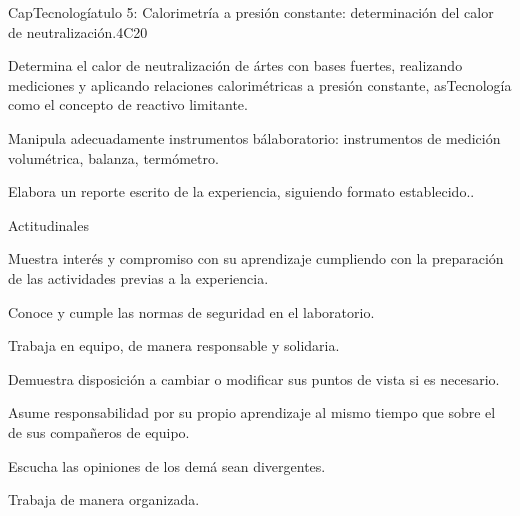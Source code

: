 \begin{syllabus}
\begin{unit}{CapTecnologíatulo 5:  Calorimetría a presión constante: determinación del calor de neutralización.}{}{}{4}{C20}
\begin{topics}
      \item Determina el calor de neutralización de ártes con bases fuertes, realizando mediciones y aplicando relaciones calorimétricas a presión constante, asTecnología como el concepto de reactivo limitante.
      \item Manipula adecuadamente instrumentos bálaboratorio: instrumentos de medición volumétrica, balanza, termómetro.
      \item Elabora un reporte escrito de la experiencia, siguiendo formato establecido..
   \end{topics}
   
   Actitudinales

\begin{topics}
      \item Muestra interés y compromiso con su aprendizaje cumpliendo con la preparación de las actividades previas a la experiencia.
	  \item Conoce y cumple las normas de seguridad en el laboratorio.
	  \item Trabaja en equipo, de manera responsable y solidaria.
	  \item Demuestra disposición a cambiar o modificar sus puntos de vista si es necesario.
	  \item Asume responsabilidad por su propio aprendizaje al mismo tiempo que sobre el de sus compañeros de equipo.
	  \item Escucha las opiniones de los demá sean divergentes.
	  \item Trabaja de manera organizada.
   \end{topics}

   \begin{learningoutcomes}
      \item 
   \end{learningoutcomes}
   
\end{unit}



\begin{coursebibliography}
\end{coursebibliography}


\end{syllabus}
